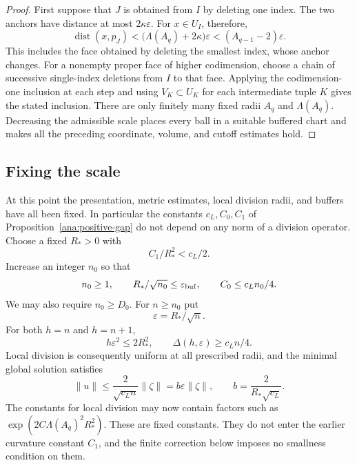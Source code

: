 \documentclass[11pt,reqno]{amsart}
\numberwithin{equation}{section}
\theoremstyle{definition}
\theoremstyle{remark}
\DeclareMathOperator{\dist}{dist}
\begin{document}
\begin{proof}
First suppose that $J$ is obtained from $I$ by deleting one index.
The two anchors have distance at most $2\kappa\varepsilon$.
For $x\in U_I$, therefore,
\[
 \dist(x,p_J)
 <\bigl(\Lambda(A_q)+2\kappa\bigr)\varepsilon
 <(A_{q-1}-2)\varepsilon.
\]
This includes the face obtained by deleting the smallest index,
whose anchor changes.  For a nonempty proper face of higher codimension, choose a chain of
successive single-index deletions from $I$ to that face. Applying the
codimension-one inclusion at each step and using $V_K\subset U_K$ for
each intermediate tuple $K$ gives the stated inclusion.  There are only finitely many
fixed radii $A_q$ and $\Lambda(A_q)$.  Decreasing the admissible
scale places every ball in a suitable buffered chart and makes
all the preceding coordinate, volume, and cutoff estimates hold.
\end{proof}

\subsection{Fixing the scale}

At this point the presentation, metric estimates, local division
radii, and buffers have all been fixed.  In particular the constants
$c_L,C_0,C_1$ of Proposition~\ref{ana:positive-gap} do not depend
on any norm of a division operator.  Choose a fixed $R_*>0$ with
\begin{equation}\label{ana:R-choice}
 C_1/R_*^2<c_L/2.
\end{equation}
Increase an integer $n_0$ so that
\[
 n_0\geq1,\qquad
 R_*/\sqrt{n_0}\leq\varepsilon_{\rm buf},\qquad
 C_0\leq c_Ln_0/4.
\]
We may also require $n_0\geq D_0$.  For $n\geq n_0$ put
\begin{equation}\label{ana:scale}
 \varepsilon=R_*/\sqrt n.
\end{equation}
For both $h=n$ and $h=n+1$,
\begin{equation}\label{ana:simultaneous-scale}
 h\varepsilon^2\leq2R_*^2,
 \qquad
 \Delta(h,\varepsilon)\geq c_Ln/4.
\end{equation}
Local division is consequently uniform at all prescribed radii,
and the minimal global solution satisfies
\begin{equation}\label{ana:scaled-solver}
 \|u\|\leq\frac{2}{\sqrt{c_Ln}}\|\zeta\|
 =b\varepsilon\|\zeta\|,
 \qquad b=\frac{2}{R_*\sqrt{c_L}}.
\end{equation}
The constants for local division may now contain factors such as
$\exp(2C\Lambda(A_q)^2R_*^2)$.  These are fixed constants.
They do not enter the earlier curvature constant $C_1$, and the
finite correction below imposes no smallness condition on them.
\end{document}
